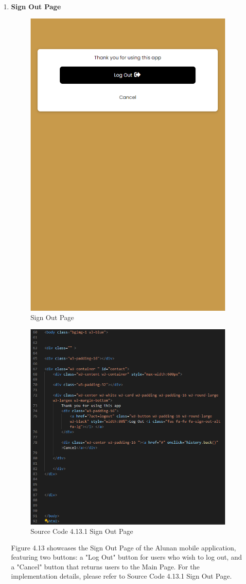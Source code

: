 \begin{enumerate}[1.]
    \item \textbf{Sign Out Page}
    \begin{figure}[h]
        \centering
        \includegraphics[width=0.5\linewidth]{mainmatter/images/frontend/ss/Sign Out.png}
        \caption{Sign Out Page}
        \label{fig:myfig52}
    \end{figure}
    \clearpage
    \begin{figure}[h]
        \centering
        \includegraphics[width=0.7\linewidth]{mainmatter/images/frontend/code/signout.png}
        \caption*{Source Code 4.13.1 Sign Out Page}
        \label{fig:myfig52a}
    \end{figure}
    Figure 4.13 showcases the Sign Out Page of the Alunan mobile application, featuring two buttons: a "Log Out" button for users who wish to log out, and a "Cancel" button that returns users to the Main Page. For the implementation details, please refer to Source Code 4.13.1 Sign Out Page.
    \clearpage


\end{enumerate}
